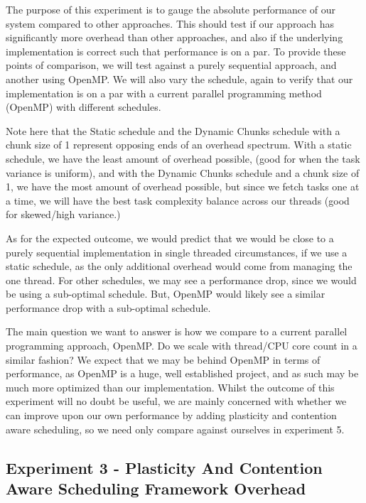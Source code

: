 The purpose of this experiment is to gauge the absolute performance of our system compared to other approaches. This should test if our approach has significantly more overhead than other approaches, and also if the underlying implementation is correct such that performance is on a par. To provide these points of comparison, we will test against a purely sequential approach, and another using OpenMP. We will also vary the schedule, again to verify that our implementation is on a par with a current parallel programming method (OpenMP) with different schedules.

Note here that the Static schedule and the Dynamic Chunks schedule with a chunk size of 1 represent opposing ends of an overhead spectrum. With a static schedule, we have the least amount of overhead possible, (good for when the task variance is uniform), and with the Dynamic Chunks schedule and a chunk size of 1, we have the most amount of overhead possible, but since we fetch tasks one at a time, we will have the best task complexity balance across our threads (good for skewed/high variance.)

As for the expected outcome, we would predict that we would be close to a purely sequential implementation in single threaded circumstances, if we use a static schedule, as the only additional overhead would come from managing the one thread. For other schedules, we may see a performance drop, since we would be using a sub-optimal schedule. But, OpenMP would likely see a similar performance drop with a sub-optimal schedule.

The main question we want to answer is how we compare to a current parallel programming approach, OpenMP. Do we scale with thread/CPU core count in a similar fashion? We expect that we may be behind OpenMP in terms of performance, as OpenMP is a huge, well established project, and as such may be much more optimized than our implementation. Whilst the outcome of this experiment will no doubt be useful, we are mainly concerned with whether we can improve upon our own performance by adding plasticity and contention aware scheduling, so we need only compare against ourselves in experiment 5.





\subsection{Experiment 3 - Plasticity And Contention Aware Scheduling Framework Overhead}

